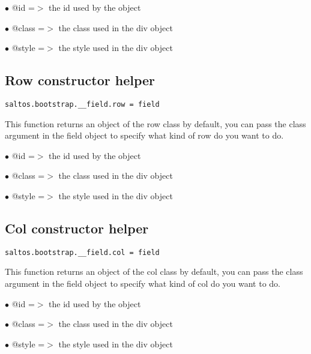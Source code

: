 \documentclass[a4paper]{book}
\begin{document}
\begin{compactitem}
\item[\color{myblue}$\bullet$] @id    =$>$ the id used by the object
\item[\color{myblue}$\bullet$] @class =$>$ the class used in the div object
\item[\color{myblue}$\bullet$] @style =$>$ the style used in the div object
\end{compactitem}

\hypertarget{toc433}{}
\subsection{Row constructor helper}

\begin{lstlisting}
saltos.bootstrap.__field.row = field
\end{lstlisting}

This function returns an object of the row class by default, you can pass the class argument
in the field object to specify what kind of row do you want to do.

\begin{compactitem}
\item[\color{myblue}$\bullet$] @id    =$>$ the id used by the object
\item[\color{myblue}$\bullet$] @class =$>$ the class used in the div object
\item[\color{myblue}$\bullet$] @style =$>$ the style used in the div object
\end{compactitem}

\hypertarget{toc434}{}
\subsection{Col constructor helper}

\begin{lstlisting}
saltos.bootstrap.__field.col = field
\end{lstlisting}

This function returns an object of the col class by default, you can pass the class argument
in the field object to specify what kind of col do you want to do.

\begin{compactitem}
\item[\color{myblue}$\bullet$] @id    =$>$ the id used by the object
\item[\color{myblue}$\bullet$] @class =$>$ the class used in the div object
\item[\color{myblue}$\bullet$] @style =$>$ the style used in the div object
\end{compactitem}
\end{document}
